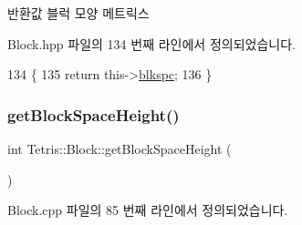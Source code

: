 \begin{DoxyReturn}{반환값}
블럭 모양 메트릭스 
\end{DoxyReturn}


Block.\+hpp 파일의 134 번째 라인에서 정의되었습니다.


\begin{DoxyCode}
134                                  \{
135                 \textcolor{keywordflow}{return} this->\hyperlink{class_tetris_1_1_block_af2f96c83a3511d32321672f794aa4db1}{blkspc};
136             \}
\end{DoxyCode}
\mbox{\label{class_tetris_1_1_block_a5301977e32c03aaf122fa289fcba77ba}} 
\subsubsection{\texorpdfstring{get\+Block\+Space\+Height()}{getBlockSpaceHeight()}\hspace{0.1cm}{\footnotesize\ttfamily [1/2]}}
{\footnotesize\ttfamily int Tetris\+::\+Block\+::get\+Block\+Space\+Height (\begin{DoxyParamCaption}{ }\end{DoxyParamCaption})}



Block.\+cpp 파일의 85 번째 라인에서 정의되었습니다.


